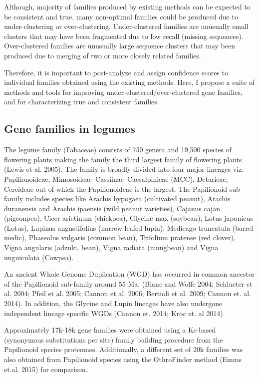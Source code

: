 \documentclass{article}
\begin{document}
		Although, majority of families produced by existing methods can be expected to be consistent and true, many non-optimal families could be produced due to under-clustering or over-clustering. Under-clustered families are unusually small clusters that may have been fragmented due to low recall (missing sequences). Over-clustered families are unusually large sequence clusters that may been produced due to merging of two or more closely related families.  
		
		Therefore, it is important to post-analyze and assign confidence scores to individual families obtained using the existing methods. Here, I propose a suite of methods and tools for improving under-clustered/over-clustered gene families, and for characterizing true and consistent families.
		
		\subsection{Gene families in legumes}
		The legume family (Fabaceae) consists of 750 genera and 19,500 species of flowering plants making the family the third largest family of flowering plants (Lewis et al. 2005). The family is broadly divided into four major lineages viz. Papilionoideae, Mimosoideae–Cassiinae–Caesalpinieae (MCC), Detarieae, Cercideae out of which the Papilionoideae is the largest. The Papilionoid sub-family includes species like Arachis hypogaea (cultivated peanut), Arachis duranensis and Arachis ipaensis (wild peanut varieties), Cajanus cajan (pigeonpea), Cicer arietinum (chickpea), Glycine max (soybean), Lotus japonicus (Lotus), Lupinus angustifolius (narrow-leafed lupin), Medicago truncatula (barrel medic), Phaseolus vulgaris (common bean), Trifolium pratense (red clover), Vigna angularis (adzuki, bean), Vigna radiata (mungbean) and Vigna unguiculata (Cowpea).
		
		An ancient Whole Genome Duplication (WGD) has occurred in common ancestor of the Papilionoid sub-family around 55 Ma. (Blanc and Wolfe 2004; Schlueter et al. 2004; Pfeil et al. 2005; Cannon et al. 2006; Bertioli et al. 2009; Cannon et. al. 2014). In addition, the Glycine and Lupin lineages have also undergone independent lineage specific WGDs (Cannon et. 2014; Kroc et. al 2014) 
		
		Approximately 17k-18k gene families were obtained using a Ks-based (synonymous substitutions per site) family building procedure from the Papilionoid species proteomes. Additionally,  a different set of 20k families was also obtained from Papilionoid species using the OthroFinder method (Emms et.al. 2015) for comparison.
		\pagebreak
\end{document}
